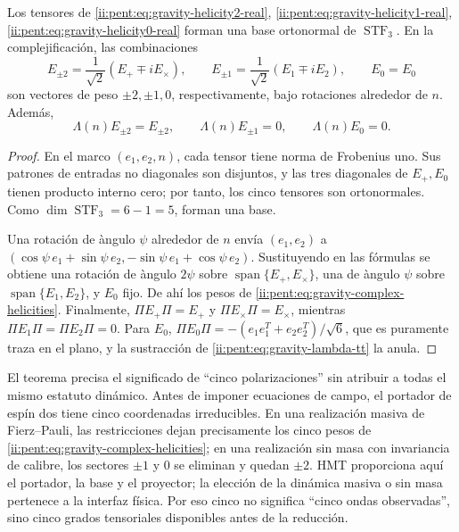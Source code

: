 \begin{theorem}
\label{ii:pent:thm:gravity-five-helicities}
Los tensores de
\eqref{ii:pent:eq:gravity-helicity2-real}, \eqref{ii:pent:eq:gravity-helicity1-real}, \eqref{ii:pent:eq:gravity-helicity0-real}
forman una base ortonormal de \(\operatorname{STF}_3\). En la
complejificaci\'on, las combinaciones
\begin{equation}
\label{ii:pent:eq:gravity-complex-helicities}
E_{\pm2}=\frac1{\sqrt2}(E_+\mp i E_\times),
\qquad
E_{\pm1}=\frac1{\sqrt2}(E_1\mp i E_2),
\qquad E_0=E_0
\end{equation}
son vectores de peso \(\pm2,\pm1,0\), respectivamente, bajo rotaciones
alrededor de \(n\). Adem\'as,
\begin{equation}
\label{ii:pent:eq:gravity-tt-on-five}
\Lambda(n)E_{\pm2}=E_{\pm2},
\qquad
\Lambda(n)E_{\pm1}=0,
\qquad
\Lambda(n)E_0=0.
\end{equation}
\end{theorem}

\begin{proof}
En el marco \((e_1,e_2,n)\), cada tensor tiene norma de Frobenius uno.
Sus patrones de entradas no diagonales son disjuntos, y las tres diagonales
de \(E_+,E_0\) tienen producto interno cero; por tanto, los cinco tensores
son ortonormales. Como \(\dim\operatorname{STF}_3=6-1=5\), forman una base.

Una rotaci\'on de \`angulo \(\psi\) alrededor de \(n\) env\'ia
\((e_1,e_2)\) a
\((\cos\psi\,e_1+\sin\psi\,e_2,
-\sin\psi\,e_1+\cos\psi\,e_2)\). Sustituyendo en las f\'ormulas se obtiene
una rotaci\'on de \`angulo \(2\psi\) sobre
\(\operatorname{span}\{E_+,E_\times\}\), una de \`angulo \(\psi\) sobre
\(\operatorname{span}\{E_1,E_2\}\), y \(E_0\) fijo. De ah\'i los pesos de
\eqref{ii:pent:eq:gravity-complex-helicities}. Finalmente,
\(\Pi E_{+}\Pi=E_+\) y \(\Pi E_\times\Pi=E_\times\), mientras
\(\Pi E_1\Pi=\Pi E_2\Pi=0\). Para \(E_0\),
\(\Pi E_0\Pi=-(e_1e_1^T+e_2e_2^T)/\sqrt6\), que es puramente traza en
el plano, y la sustracci\'on de \eqref{ii:pent:eq:gravity-lambda-tt} la anula.
\end{proof}

El teorema precisa el significado de ``cinco polarizaciones'' sin atribuir
a todas el mismo estatuto din\'amico. Antes de imponer ecuaciones de campo,
el portador de esp\'in dos tiene cinco coordenadas irreducibles. En una
realizaci\'on masiva de Fierz--Pauli, las restricciones dejan precisamente
los cinco pesos de \eqref{ii:pent:eq:gravity-complex-helicities}; en una realizaci\'on
sin masa con invariancia de calibre, los sectores \(\pm1\) y \(0\) se eliminan y
quedan \(\pm2\). HMT proporciona aqu\'i el portador, la base y el proyector;
la elecci\'on de la din\'amica masiva o sin masa pertenece a la interfaz
f\'isica. Por eso cinco no significa ``cinco ondas observadas'', sino cinco
grados tensoriales disponibles antes de la reducci\'on.

